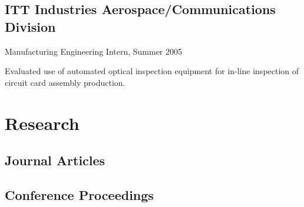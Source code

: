 \documentclass[10pt,letterpaper]{article}
\renewenvironment{itemize}{
  \begin{list}{}{
    \setlength{\leftmargin}{1.5em}
    \setlength{\itemsep}{0.25em}
    \setlength{\parskip}{0pt}
    \setlength{\parsep}{0.25em}
  }
}{
  \end{list}
}
\begin{document}
\subsection*{ITT Industries Aerospace/Communications Division}

\begin{itemize}
\item Manufacturing Engineering Intern, Summer 2005
    \begin{itemize}
    \item Evaluated use of automated optical inspection equipment for in-line inspection of circuit card assembly production.
    \end{itemize}
\end{itemize}

%
%

\section*{Research}

\subsection*{Journal Articles}
\begin{itemize}
\item {}
\end{itemize}

\subsection*{Conference Proceedings}
\begin{itemize}
\item {}                                             
\item {}
\item {}
\item {}
\end{itemize}
\end{document}
